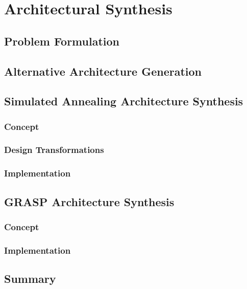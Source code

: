 \chapter{Architectural Synthesis}

\section{Problem Formulation}

\section{Alternative Architecture Generation}

\section{Simulated Annealing Architecture Synthesis}

\subsection{Concept}

\subsection{Design Transformations}

\subsection{Implementation}

\section{GRASP Architecture Synthesis}

\subsection{Concept}

\subsection{Implementation}

\section{Summary}
